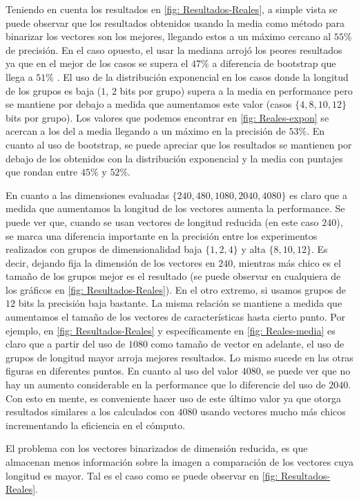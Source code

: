 	Teniendo en cuenta los resultados en \ref{fig: Resultados-Reales}, a simple vista se puede observar que los resultados obtenidos usando la media como método para binarizar los vectores son los mejores, llegando estos a un máximo cercano al $55\%$ de precisión. En el caso opuesto, el usar la mediana arrojó los peores resultados ya que en el mejor de los casos se supera el $47\%$ a diferencia de bootstrap que llega a $51\%$ . El uso de la distribución exponencial en los casos donde la longitud de los grupos es baja ($1$, $2$ bits por grupo) supera a la media en performance pero se mantiene por debajo a medida que aumentamos este valor (casos $\{ 4, 8, 10, 12\}$ bits por grupo). Los valores que podemos encontrar en \ref{fig: Reales-expon} se acercan a los del a media llegando a un máximo en la precisión de $53\%$. En cuanto al uso de bootstrap, se puede apreciar que los resultados se mantienen por debajo de los obtenidos con la distribución exponencial y la media con puntajes que rondan entre $45\%$ y $52\%$.
	
	En cuanto a las dimensiones evaluadas $\{ 240, 480, 1080, 2040, 4080 \}$ es claro que a medida que aumentamos la longitud de los vectores aumenta la performance. Se puede ver que, cuando se usan vectores de longitud reducida (en este caso $240$), se marca una diferencia importante en la precisión entre los experimentos realizados con grupos de dimensionalidad baja $\{ 1, 2, 4 \}$ y alta $\{8, 10, 12\}$. Es decir, dejando fija la dimensión de los vectores en $240$, mientras más chico es el tamaño de los grupos mejor es el resultado (se puede observar en cualquiera de los gráficos en \ref{fig: Resultados-Reales}). En el otro extremo, si usamos grupos de $12$ bits la precisión baja bastante. La misma relación se mantiene a medida que aumentamos el tamaño de los vectores de características hasta cierto punto. Por ejemplo, en \ref{fig: Resultados-Reales} y específicamente en \ref{fig: Reales-media} es claro que a partir del uso de $1080$ como tamaño de vector en adelante, el uso de grupos de longitud mayor arroja mejores resultados. Lo mismo sucede en las otras figuras en diferentes puntos. En cuanto al uso del valor $4080$, se puede ver que no hay un aumento considerable en la performance que lo diferencie del uso de $2040$. Con esto en mente, es conveniente hacer uso de este último valor ya que otorga resultados similares a los calculados con $4080$ usando vectores mucho más chicos incrementando la eficiencia en el cómputo.
	
	El problema con los vectores binarizados de dimensión reducida, es que almacenan menos información sobre la imagen a comparación de los vectores cuya longitud es mayor. Tal es el caso como se puede observar en \ref{fig: Resultados-Reales}. 
	
